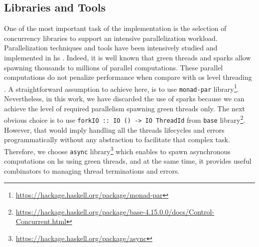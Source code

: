 \subsection{Libraries and Tools}
One of the most important task of the implementation is the selection of concurrency libraries to support an intensive parallelization workload. Parallelization techniques and tools have been intensively studied and implemented in \acrshort{hs} \cite{monadpar}. 
Indeed, it is well known that green threads and sparks allow spawning thousands to millions of parallel computations. 
These parallel computations do not penalize performance when compare with \acrfull{os} level threading \cite{parallelbook}. 
A straightforward assumption to achieve here, is to use \texttt{monad-par} library\footnote{\url{https://hackage.haskell.org/package/monad-par}}. 
Nevertheless, in this work, we have discarded the use of sparks \cite{sparks,sparks1} because we can achieve the level of required parallelism spawning green threads only.
The next obvious choice is to use \texttt{forkIO :: IO () -> IO ThreadId} from \texttt{base} library\footnote{\url{https://hackage.haskell.org/package/base-4.15.0.0/docs/Control-Concurrent.html}}. 
However, that would imply handling all the threads lifecycles and errors programmatically without any abstraction to facilitate that complex task. 
Therefore, we choose \texttt{async} library\footnote{\url{https://hackage.haskell.org/package/async}} which enables to spawn asynchronous computations \cite{parallelbook} on \acrshort{hs} using green threads, and at the same time, it provides useful combinators to managing thread terminations and errors.

